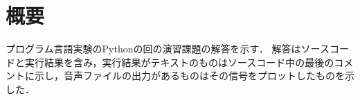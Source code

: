 \section{概要}
プログラム言語実験のPythonの回の演習課題の解答を示す．
解答はソースコードと実行結果を含み，実行結果がテキストのものはソースコード中の最後のコメントに示し，音声ファイルの出力があるものはその信号をプロットしたものを示した．
